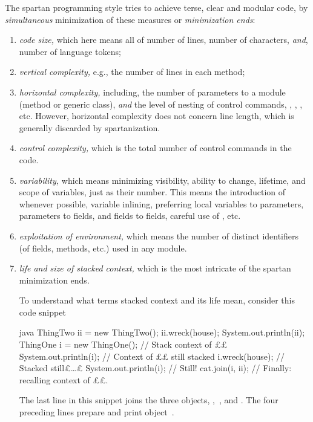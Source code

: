 The spartan programming style tries to achieve terse, clear and modular code,
by \textit{simultaneous} minimization of these measures or \emph{minimization
ends}:
\begin{enumerate}
  \item \textit{code size,} which here means all of number of lines, number of
        characters, \emph{and}, number of language tokens;
  \item \textit{vertical complexity,} e.g., the number of lines in each
        method;
  \item \textit{horizontal complexity,} including, the number of parameters to a
        module (method or generic class), \emph{and} the level of nesting of
        control commands, , , , etc. However,
        horizontal complexity does not concern line length, which is generally
        discarded by spartanization.
  \item \textit{control complexity,} which is the total number of control
        commands in the code.
  \item \textit{variability,} which means minimizing visibility, ability to
        change, lifetime, and scope of variables, just as their number.
        This means the introduction of  whenever possible,
        variable inlining, preferring local variables to parameters, parameters
        to fields, and fields to  fields, careful use of
        , etc.
  \item \textit{exploitation of environment,} which means the number of
    distinct identifiers (of fields, methods, etc.) used in any module.
  \item \textit{life and size of stacked context,} which is the most intricate of the
        spartan minimization ends.

        To understand what terms stacked context and its life mean, consider
        this code snippet

\begin{code}[minipage,width=54ex]{java}
ThingTwo ii = new ThingTwo();
ii.wreck(house);
System.out.println(ii);
ThingOne i = new ThingOne(); // Stack context of ££
System.out.println(i); // Context of ££ still stacked
i.wreck(house); // Stacked still£…£
System.out.println(i); // Still!
cat.join(i, ii); // Finally: recalling context of ££.
  \end{code}
  The last line in this snippet joins the three objects,
  ,~, and . The four preceding lines prepare
  and print object~.


\end{enumerate}

